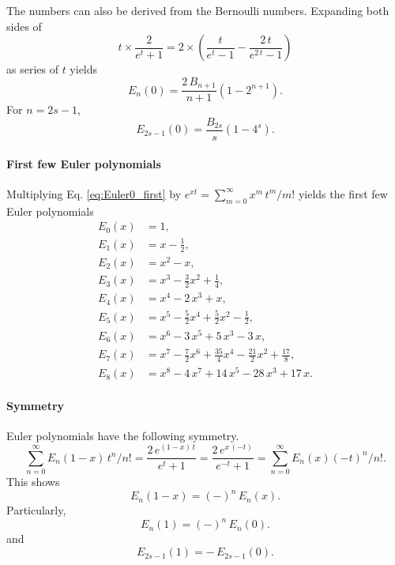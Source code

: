 \documentclass[aip,jcp,preprint,notitlepage, superscriptaddress]{revtex4-1}
\begin{document}
The numbers can also be derived from the Bernoulli numbers.
%
Expanding both sides of
\[
t \times \frac{ 2 }{ e^t + 1}
=
2 \times \left(
  \frac{ t }{ e^t - 1 }
  -
  \frac{ 2 \, t } { e^{2 \, t} - 1 }
\right)
\]
as series of $t$ yields
\[
E_n(0)
=
\frac{ 2 \, B_{n + 1} } { n + 1 }
\left( 1 - 2^{n + 1} \right).
\]
%
For $n = 2 s - 1$,
\[
E_{2 s - 1}(0)
=
\frac{ B_{2 s} } { s }
\left( 1 - 4^s \right).
\]



\paragraph{First few Euler polynomials}




Multiplying Eq. \eqref{eq:Euler0_first}
by $e^{x t} = \sum_{m = 0}^\infty x^m \, t^m/m!$ yields
the first few Euler polynomials\cite{
abramowitz, wang_specfunc}
\begin{align*}
  E_0(x) &= 1, \\
  E_1(x) &= x -\frac 1 2, \\
  E_2(x) &= x^2 - x, \\
  E_3(x) &= x^3 - \frac 3 2 x^2 + \frac 1 4, \\
  E_4(x) &= x^4 - 2 \, x^3  + x, \\
  E_5(x) &= x^5 - \frac 5 2 x^4 + \frac 5 2 x^2 -\frac 1 2, \\
  E_6(x) &= x^6 - 3 \, x^5 + 5 \, x^3 - 3 \, x, \\
  E_7(x) &= x^7 - \frac 7 2 x^6 + \frac{35}{4} x^4 - \frac{21}{2} x^2 + \frac{ 17 } 8, \\
  E_8(x) &= x^8 - 4 \, x^7 + 14 \, x^5 - 28 \, x^3 + 17 \, x.
\end{align*}



\paragraph{Symmetry}



Euler polynomials have the following symmetry.
%
\begin{equation*}
\sum_{n = 0}^\infty
E_n(1 - x) \, t^n/n!
=
\frac{ 2 \, e^{(1 - x) \, t} }
{ e^t + 1 }
=
\frac{ 2 \, e^{ x \, (-t)} }
{ e^{-t} + 1 }
=
\sum_{n = 0}^\infty
E_n(x) (-t)^n / n!.
\end{equation*}
%
This shows
\[
E_n(1 - x) = (-)^n \, E_n(x).
\]
Particularly,
\[
E_n(1) = (-)^n \, E_n(0).
\]
and
\begin{equation}
E_{2s - 1}(1) = - \, E_{2s - 1}(0).
\label{eq:Euler1_odd}
\end{equation}
\end{document}
